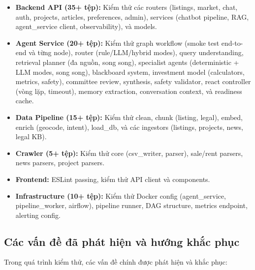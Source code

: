 \begin{itemize}
    \item \textbf{Backend API (35+ tệp):} Kiểm thử các routers (listings, market, chat, auth, projects, articles, preferences, admin), services (chatbot pipeline, RAG, agent\_service client, observability), và models.

    \item \textbf{Agent Service (20+ tệp):} Kiểm thử graph workflow (smoke test end-to-end và từng node), router (rule/LLM/hybrid modes), query understanding, retrieval planner (đa nguồn, song song), specialist agents (deterministic + LLM modes, song song), blackboard system, investment model (calculators, metrics, safety), committee review, synthesis, safety validator, react controller (vòng lặp, timeout), memory extraction, conversation context, và readiness cache.

    \item \textbf{Data Pipeline (15+ tệp):} Kiểm thử clean, chunk (listing, legal), embed, enrich (geocode, intent), load\_db, và các ingestors (listings, projects, news, legal KB).

    \item \textbf{Crawler (5+ tệp):} Kiểm thử core (csv\_writer, parser), sale/rent parsers, news parsers, project parsers.

    \item \textbf{Frontend:} ESLint passing, kiểm thử API client và components.

    \item \textbf{Infrastructure (10+ tệp):} Kiểm thử Docker config (agent\_service, pipeline\_worker, airflow), pipeline runner, DAG structure, metrics endpoint, alerting config.
\end{itemize}

\subsection{Các vấn đề đã phát hiện và hướng khắc phục}

Trong quá trình kiểm thử, các vấn đề chính được phát hiện và khắc phục:

